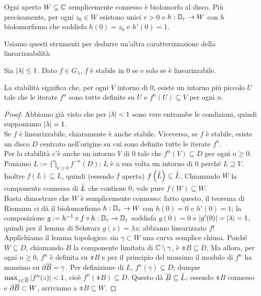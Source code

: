 \begin{teo}[Riemann]Ogni aperto $W\subsetneq\mathbb{C}$ semplicemente connesso è biolomorfo al disco.
Più precisamente, per ogni $z_0\in W$ esistono unici $r>0$ e $h:\mathbb{D}_r\to W$ con $h$ biolomorfismo
che soddisfa $h(0)=z_0$ e $h'(0)=1$.
\end{teo}

Usiamo questi strumenti per dedurre un'altra caratterizzazione della linearizzabilità:

\begin{teo}Sia $\left|\lambda\right|\le 1$. Dato $f\in G_\lambda$, $f$ è stabile in $0$ se e solo se è linearizzabile.
\end{teo}

La stabilità significa che, per ogni $V$ intorno di $0$, esiste un intorno più piccolo $U$ tale che
le iterate $f^n$ sono tutte definite su $U$ e $f^n(U)\subseteq V$ per ogni $n$.

\begin{proof}Abbiamo già visto che per $\left|\lambda\right|<1$ sono vere entrambe le condizioni,
quindi supponiamo $\left|\lambda\right|=1$. \\
Se $f$ è linearizzabile, chiaramente è anche stabile. Viceversa, se $f$ è stabile, esiste un disco $D$
centrato nell'origine su cui sono definite tutte le iterate $f^n$. \\
Per la stabilità c'è anche un intorno $V$ di $0$ tale che $f^n(V)\subseteq D$ per ogni $n\ge 0$.
Poniamo $L:=\bigcap_{n\ge 0}f^{-n}(D)$: $L$ è a sua volta un intorno di $0$ perché $L\supseteq V$. \\
Inoltre $f(L)\subseteq L$, quindi (essendo $f$ aperta) $f\left(\accentset{\circ}{L}\right)\subseteq\accentset{\circ}{L}$.
Chiamando $W$ la componente connessa di $\accentset{\circ}{L}$ che contiene $0$, vale pure $f(W)\subseteq W$. \\
Basta dimostrare che $W$ è semplicemente connesso: fatto questo, il teorema di Riemann ci dà
il biolomorfismo $h:\mathbb{D}_r\to W$ con $h(0)=0$ e $h'(0)=1$; la composizione $g:=h^{-1}\circ f\circ h:\mathbb{D}_r\to\mathbb{D}_r$
soddisfa $g(0)=0$ e $\left|g'(0)\right|=\left|\lambda\right|=1$, quindi per il lemma di Schwarz $g(z)=\lambda z$:
abbiamo linearizzato $f$! \\
Applichiamo il lemma topologico: sia $\gamma\subset W$ una curva semplice chiusa. Poiché $W\subseteq D$,
chiamando $B$ la componente limitata di $\mathbb{C}\setminus\gamma$, è $\obar{B}\subseteq D$.
Ma allora, per ogni $n\ge 0$, $f^n$ è definita su $\obar{B}$ e per il principio del massimo
il modulo di $f^n$ ha massimo su $\partial\overline{B}=\gamma$. Per definizione di $L$, $f^n(\gamma)\subseteq D$;
dunque $\max_{z\in\overline{B}}\left|f^n(z)\right|<1$, cioè $f^n(\obar{B})\subseteq D$.
Questo dà $\overline{B}\subseteq\accentset{\circ}{L}$; essendo $\obar{B}$ connesso e $\partial\overline{B}\subset W$, arriviamo a $\obar{B}\subseteq W$.
\end{proof}

